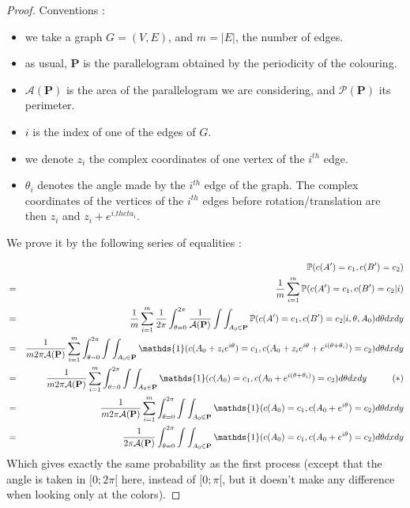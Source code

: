 \documentclass[a4paper,11pt]{article}
\theoremstyle{definition}
\theoremstyle{remark}
\begin{document}
\begin{proof}
Conventions : 
\begin{itemize}
\item we take a graph $G=(V,E)$, and $m = |E|$, the number of edges.

\item as usual, $\mathbf{P}$ is the parallelogram obtained by the periodicity of the colouring.

\item $\mathcal{A}(\mathbf{P})$ is the area of the parallelogram we are considering, and $\mathcal{P}(\mathbf{P})$ its perimeter.

\item $i$ is the index of one of the edges of $G$.

\item we denote $z_i$ the complex coordinates of one vertex of the $i^{th}$ edge.

\item $\theta_i$ denotes the angle made by the $i^{th}$ edge of the graph. The complex coordinates of the vertices of the $i^{th}$ edges before rotation/translation are then $z_i $ and $z_i + e^{i.theta_i}$.

\end{itemize}

We prove it by the following series of equalities :

\begin{eqnarray*}
& & \mathbb{P}(c(A') = c_1, c(B') = c_2) \\
  &=& \frac{1}{m}\sum_{i=1}^{m} \mathbb{P}(c(A') = c_1, c(B') = c_2 | i)  \\
  &=& \frac{1}{m}\sum_{i=1}^{m}  \frac{1}{2\pi}\int_{\theta =0} ^{2\pi} \frac{1}{\mathcal{A}(\mathbf{P})}\int\int_{A_0 \in \mathbf{P}} \mathbb{P}(c(A') = c_1, c(B') = c_2 | i, \theta, A_0) d\theta dx dy \\  
  &=& \frac{1}{m 2\pi \mathcal{A}(\mathbf {P})}\sum_{i=1}^{m}\int_{\theta =0} ^{2\pi} \int\int_{A_0 \in \mathbf{P}} \mathds{1}(c(A_0 + z_i e^{i\theta}) = c_1, c(A_0 +z_i e^{i\theta} + e^{i (\theta + \theta_i)}) = c_2) d\theta dx dy \\  
    &=& \frac{1}{m 2\pi \mathcal{A}(\mathbf{P})}\sum_{i=1}^{m} \int_{\theta =0} ^{2\pi} \int\int_{A_0 \in \mathbf{P}} \mathds{1}(c(A_0) = c_1, c(A_0 + e^{i (\theta + \theta_i)}) = c_2 ) d\theta dx dy \hspace{1 cm} (*)\\ 
    &=& \frac{1}{m 2\pi \mathcal{A}(\mathbf{P})}\sum_{i=1}^{m} \int_{\theta =0} ^{2\pi} \int\int_{A_0 \in \mathbf{P}} \mathds{1}(c(A_0) = c_1, c(A_0 + e^{i \theta}) = c_2 ) d\theta dx dy \\ 
    &=& \frac{1}{2\pi \mathcal{A}(\mathbf{P})}\int_{\theta =0} ^{2\pi} \int\int_{A_0 \in \mathbf{P}} \mathds{1}(c(A_0) = c_1, c(A_0 + e^{i \theta}) = c_2 ) d\theta dx dy \\ 
\end{eqnarray*}
Which gives exactly the same probability as the first process (except that the angle is taken in $[0;2\pi[$ here, instead of $[0;\pi[$, but it doesn't make any difference when looking only at the colors).


\end{proof}
\end{document}
